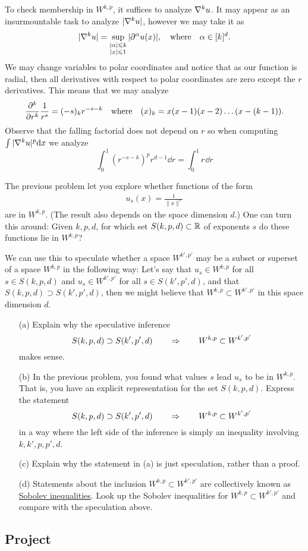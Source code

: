 \documentclass[12pt]{memoir}
\begin{document}
\begin{ptcbr}
To check membership in $W^{k,p}$, it suffices to analyze $\nabla^k u$. It may appear as an insurmountable task to analyze $|\nabla^k u|$, however we may take it as 
$$|\nabla^k u|=\sup_{\substack{|\alpha|\leqslant k\\ |x|\leqslant 1}}|\partial^\alpha u(x)|,\quad\text{where}\quad\alpha\in[k]^d.$$
We may change variables to polar coordinates and notice that as our function is radial, then all derivatives with respect to polar coordinates are zero except the $r$ derivatives. This means that we may analyze 
$$\pdv[k]{r}\frac{1}{r^s}=(-s)_kr^{-s-k}\quad\text{where}\quad(x)_k=x(x-1)(x-2)\dots(x-(k-1)).$$
Observe that the falling factorial does not depend on $r$ so when computing $\int|\nabla^k u|^p\dd x$ we analyze
$$\int_0^1(r^{-s-k})^pr^{d-1}\dd r=\int_0^1r^{}\dd r$$
\end{ptcbr}
\begin{Ej}
    The previous problem let you explore whether functions of the form
  \begin{align*}
    u_s(x) = \frac{1}{\|x\|^s}
  \end{align*}
  are in $W^{k,p}$. (The result also depends on the space dimension
  $d$.) One can turn this around: Given $k,p,d$, for which set
  $S(k,p,d)\subset \mathbb{R}$ of exponents $s$ do these functions lie in $W^{k,p}$?

  We can use this to speculate whether a space $W^{k',p'}$ may be a
  subset or superset of a space $W^{k,p}$ in the following way: Let's
  say that $u_s \in W^{k,p}$ for all $s\in S(k,p,d)$ and 
  $u_s \in W^{k',p'}$ for all $s\in S(k',p',d)$, and that 
  $S(k,p,d) \supset S(k',p',d)$, then we might believe that 
  $W^{k,p} \subset W^{k',p'}$ in this space dimension $d$.

  \begin{itemize}
  \item[(a)] Explain why the speculative inference
  $$
    S(k,p,d) \supset S(k',p',d)
    \qquad\Rightarrow\qquad
    W^{k,p} \subset W^{k',p'}
  $$
  makes sense.

  \item[(b)] In the previous problem, you found what values $s$ lead
    $u_s$ to be in $W^{k,p}$. That is, you have an explicit
    representation for the set $S(k,p,d)$. Express the statement
    $$
    S(k,p,d) \supset S(k',p',d)
    \qquad\Rightarrow\qquad
    W^{k,p} \subset W^{k',p'}
  $$
  in a way where the left side of the inference is simply an
  inequality involving $k,k',p,p',d$.

  \item[(c)] Explain why the statement in (a) is just speculation, rather than a
    proof.

  \item[(d)] Statements about the inclusion $W^{k,p} \subset
    W^{k',p'}$ are collectively known as
    \href{https://en.wikipedia.org/wiki/Sobolev_inequality}{Sobolev
      inequalities}. Look up the Sobolev inequalities for $W^{k,p} \subset
    W^{k',p'}$ and compare with the speculation above. 
  \end{itemize}
\end{Ej}

\subsection*{Project}
\end{document}
